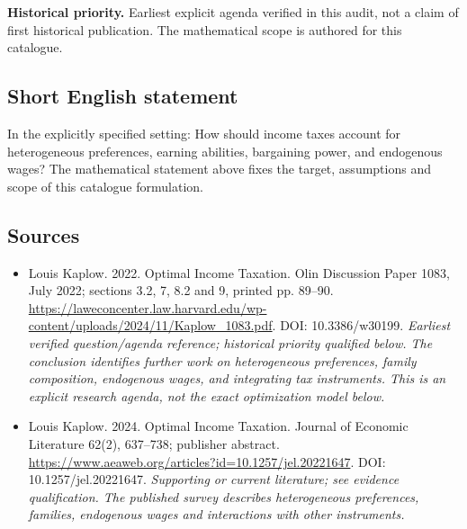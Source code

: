 \documentclass[11pt]{article}
\begin{document}
\par\textbf{Historical priority.} Earliest explicit agenda verified in this audit, not a claim of first historical publication. The mathematical scope is authored for this catalogue.

\subsection{Short English statement}
In the explicitly specified setting: How should income taxes account for heterogeneous preferences, earning abilities, bargaining power, and endogenous wages? The mathematical statement above fixes the target, assumptions and scope of this catalogue formulation.

\subsection{Sources}
\begin{itemize}\raggedright
\item[\textnormal{[S1]}]\hypertarget{source:30007752:1}{} Louis Kaplow. 2022. Optimal Income Taxation. Olin Discussion Paper 1083, July 2022; sections 3.2, 7, 8.2 and 9, printed pp. 89–90.
\url{https://laweconcenter.law.harvard.edu/wp-content/uploads/2024/11/Kaplow_1083.pdf}.
DOI: 10.3386/w30199.
{\small\textit{Earliest verified question/agenda reference; historical priority qualified below. The conclusion identifies further work on heterogeneous preferences, family composition, endogenous wages, and integrating tax instruments. This is an explicit research agenda, not the exact optimization model below.}}

\item[\textnormal{[S2]}]\hypertarget{source:30007752:2}{} Louis Kaplow. 2024. Optimal Income Taxation. Journal of Economic Literature 62(2), 637–738; publisher abstract.
\url{https://www.aeaweb.org/articles?id=10.1257/jel.20221647}.
DOI: 10.1257/jel.20221647.
{\small\textit{Supporting or current literature; see evidence qualification. The published survey describes heterogeneous preferences, families, endogenous wages and interactions with other instruments.}}
\end{itemize}
\end{document}
